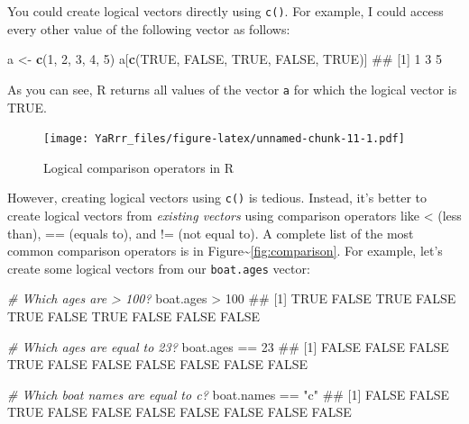 \documentclass[]{book}
\newenvironment{Shaded}{\begin{snugshade}}{\end{snugshade}}
\newcommand{\KeywordTok}[1]{\textcolor[rgb]{0.13,0.29,0.53}{\textbf{{#1}}}}
\newcommand{\DecValTok}[1]{\textcolor[rgb]{0.00,0.00,0.81}{{#1}}}
\newcommand{\StringTok}[1]{\textcolor[rgb]{0.31,0.60,0.02}{{#1}}}
\newcommand{\CommentTok}[1]{\textcolor[rgb]{0.56,0.35,0.01}{\textit{{#1}}}}
\newcommand{\OtherTok}[1]{\textcolor[rgb]{0.56,0.35,0.01}{{#1}}}
\newcommand{\NormalTok}[1]{{#1}}
\theoremstyle{definition}
\theoremstyle{definition}
\theoremstyle{remark}
\begin{document}
You could create logical vectors directly using \texttt{c()}. For
example, I could access every other value of the following vector as
follows:

\begin{Shaded}
\begin{Highlighting}[]
\NormalTok{a <-}\StringTok{ }\KeywordTok{c}\NormalTok{(}\DecValTok{1}\NormalTok{, }\DecValTok{2}\NormalTok{, }\DecValTok{3}\NormalTok{, }\DecValTok{4}\NormalTok{, }\DecValTok{5}\NormalTok{)}
\NormalTok{a[}\KeywordTok{c}\NormalTok{(}\OtherTok{TRUE}\NormalTok{, }\OtherTok{FALSE}\NormalTok{, }\OtherTok{TRUE}\NormalTok{, }\OtherTok{FALSE}\NormalTok{, }\OtherTok{TRUE}\NormalTok{)]}
\NormalTok{## [1] 1 3 5}
\end{Highlighting}
\end{Shaded}

As you can see, R returns all values of the vector \texttt{a} for which
the logical vector is TRUE.

\begin{figure}[htbp]
\centering
\texttt{[image: YaRrr\_files/figure-latex/unnamed-chunk-11-1.pdf]}
\caption{\label{fig:unnamed-chunk-11}Logical comparison operators in R}
\end{figure}

However, creating logical vectors using \texttt{c()} is tedious.
Instead, it's better to create logical vectors from \emph{existing
vectors} using comparison operators like \textless{} (less than), ==
(equals to), and != (not equal to). A complete list of the most common
comparison operators is in Figure\textasciitilde{}\ref{fig:comparison}.
For example, let's create some logical vectors from our
\texttt{boat.ages} vector:

\begin{Shaded}
\begin{Highlighting}[]
\CommentTok{# Which ages are > 100?}
\NormalTok{boat.ages >}\StringTok{ }\DecValTok{100}
\NormalTok{##  [1]  TRUE FALSE  TRUE FALSE  TRUE FALSE  TRUE FALSE FALSE FALSE}

\CommentTok{# Which ages are equal to 23?}
\NormalTok{boat.ages ==}\StringTok{ }\DecValTok{23}
\NormalTok{##  [1] FALSE FALSE FALSE  TRUE FALSE FALSE FALSE FALSE FALSE FALSE}

\CommentTok{# Which boat names are equal to c?}
\NormalTok{boat.names ==}\StringTok{ "c"}
\NormalTok{##  [1] FALSE FALSE  TRUE FALSE FALSE FALSE FALSE FALSE FALSE FALSE}
\end{Highlighting}
\end{Shaded}
\end{document}
